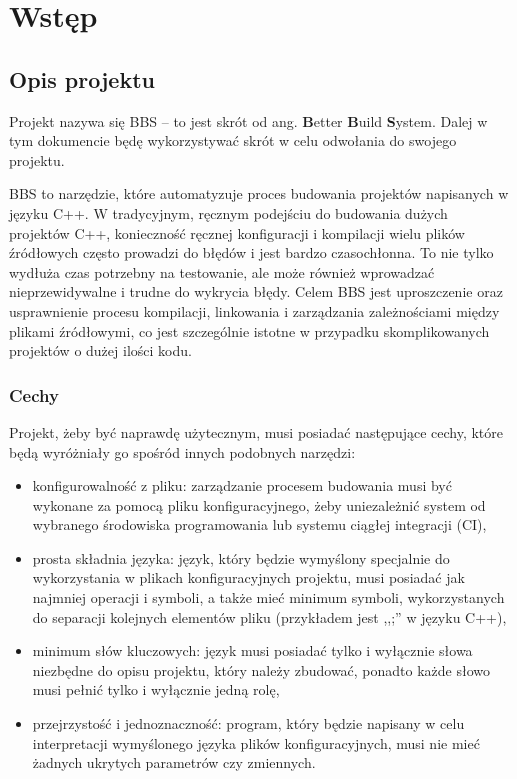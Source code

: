 \chapter{Wstęp}
\section{Opis projektu}

Projekt nazywa się BBS -- to jest skrót od ang. \textbf{B}etter \textbf{B}uild \textbf{S}ystem. Dalej w tym dokumencie będę wykorzystywać skrót w celu odwołania do swojego projektu.

BBS to narzędzie, które automatyzuje proces budowania projektów napisanych w języku C++. W tradycyjnym, ręcznym podejściu do budowania dużych projektów C++, konieczność ręcznej konfiguracji i kompilacji wielu plików źródłowych często prowadzi do błędów i jest bardzo czasochłonna. To nie tylko wydłuża czas potrzebny na testowanie, ale może również wprowadzać nieprzewidywalne i trudne do wykrycia błędy. Celem BBS jest uproszczenie oraz usprawnienie procesu kompilacji, linkowania i zarządzania zależnościami między plikami źródłowymi, co jest szczególnie istotne w przypadku skomplikowanych projektów o dużej ilości kodu.

\subsection{Cechy}
Projekt, żeby być naprawdę użytecznym, musi posiadać następujące cechy, które będą wyróżniały go spośród innych podobnych narzędzi:

\begin{itemize}
    \item konfigurowalność z pliku: zarządzanie procesem budowania musi być wykonane za pomocą pliku konfiguracyjnego, żeby uniezależnić system od wybranego środowiska programowania lub systemu ciągłej integracji (CI),
    \item prosta składnia języka: język, który będzie wymyślony specjalnie do wykorzystania w plikach konfiguracyjnych projektu, musi posiadać jak najmniej operacji i symboli, a także mieć minimum symboli, wykorzystanych do separacji kolejnych elementów pliku (przykładem jest ,,;'' w języku C++),
    \item minimum słów kluczowych: język musi posiadać tylko i wyłącznie słowa niezbędne do opisu projektu, który należy zbudować, ponadto każde słowo musi pełnić tylko i wyłącznie jedną rolę,
    \item przejrzystość i jednoznaczność: program, który będzie napisany w celu interpretacji wymyślonego języka plików konfiguracyjnych, musi nie mieć żadnych ukrytych parametrów czy zmiennych.
\end{itemize}

